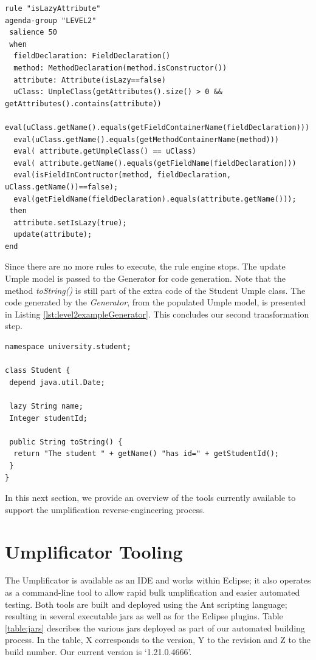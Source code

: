 \begin{lstlisting}[language={drools},label=lst:isLazyAttribute, caption=Rule isLazyAttribute]
rule "isLazyAttribute"
agenda-group "LEVEL2" 
 salience 50
 when
  fieldDeclaration: FieldDeclaration()
  method: MethodDeclaration(method.isConstructor())
  attribute: Attribute(isLazy==false)
  uClass: UmpleClass(getAttributes().size() > 0 && 							      getAttributes().contains(attribute))
  eval(uClass.getName().equals(getFieldContainerName(fieldDeclaration)))
  eval(uClass.getName().equals(getMethodContainerName(method)))
  eval( attribute.getUmpleClass() == uClass) 
  eval( attribute.getName().equals(getFieldName(fieldDeclaration))) 
  eval(isFieldInContructor(method, fieldDeclaration, uClass.getName())==false);
  eval(getFieldName(fieldDeclaration).equals(attribute.getName()));
 then
  attribute.setIsLazy(true);
  update(attribute);
end
\end{lstlisting}

Since there are no more rules to execute, the rule engine stops. The update Umple model is passed to the Generator for code generation. Note that the method \textit{toString()} is still part of the extra code of the Student Umple class.
The code generated by the \textit{Generator}, from the populated Umple model, is presented in Listing \ref{lst:level2exampleGenerator}. This concludes our second transformation step.

\begin{lstlisting}[style=umpleOut, label=lst:level2exampleGenerator, caption=Umple code generated -- Level 2]
namespace university.student;

class Student {
 depend java.util.Date;
	
 lazy String name;
 Integer studentId;
       
 public String toString() {
  return "The student " + getName() "has id=" + getStudentId();
 }
}   
\end{lstlisting}

In this next section, we provide an overview of the tools currently available to support the umplification reverse-engineering process.

\section{Umplificator Tooling}

The Umplificator is available as an IDE and works within Eclipse; it also operates as a command-line tool to allow rapid bulk umplification and easier automated testing. Both tools are built and deployed using the Ant scripting language; resulting in several executable jars as well as for the Eclipse plugins. Table \ref{table:jars} describes the various jars deployed as part of our automated building process. In the table, X corresponds to the version, Y to the revision and Z to the build number. Our current version is `1.21.0.4666'.

